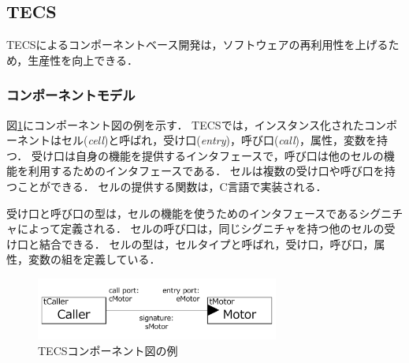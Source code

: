 \documentclass[submit,techrep]{ipsj}
\begin{document}

\subsection{TECS\cite{par:TECS}}
TECSによるコンポーネントベース開発は，ソフトウェアの再利用性を上げるため，生産性を向上できる．


\subsubsection{コンポーネントモデル}
図\ref{fig:component}にコンポーネント図の例を示す．
TECSでは，インスタンス化されたコンポーネントはセル({\it cell})と呼ばれ，受け口({\it entry})，呼び口({\it call})，属性，変数を持つ．
受け口は自身の機能を提供するインタフェースで，呼び口は他のセルの機能を利用するためのインタフェースである．
セルは複数の受け口や呼び口を持つことができる．
セルの提供する関数は，C言語で実装される．

受け口と呼び口の型は，セルの機能を使うためのインタフェースであるシグニチャによって定義される．
セルの呼び口は，同じシグニチャを持つ他のセルの受け口と結合できる．
セルの型は，セルタイプと呼ばれ，受け口，呼び口，属性，変数の組を定義している．

\begin{figure}[t]
    \centering
    \includegraphics[width=8cm,clip]{../EMSOFT2016/figure/component_diagram.pdf}
    \caption{TECSコンポーネント図の例}
    \vspace{-2mm}
    \label{fig:component}
\end{figure}
\end{document}
